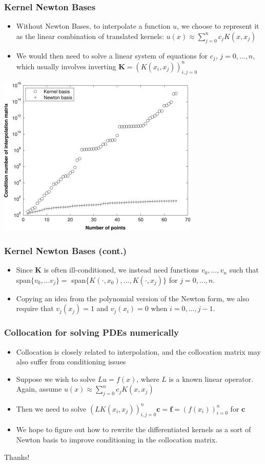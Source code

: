 \documentclass{beamer}
\begin{document}
\begin{frame}
\frametitle{Kernel Newton Bases}
\begin{itemize}
\item Without Newton Bases, to interpolate a function $u$, we choose to represent it as the linear combination of translated kernels: $u(x) \approx \sum_{j=0}^n c_j K(x, x_j)$
\item We would then need to solve a linear system of equations for $c_j$, $j=0,...,n$, which usually involves inverting $\mathbf{K} = (K(x_i,x_j))_{i,j=0}^n$
\end{itemize}
\centering\includegraphics[scale=0.6]{ill_cond}

\end{frame}

\begin{frame}
\frametitle{Kernel Newton Bases (cont.)}
\begin{itemize}
\item Since $\mathbf{K}$ is often ill-conditioned, we instead need functions $v_0, ..., v_n$ such that span$\{ v_0, ... v_j \} = $ span$\{K(\cdot, x_0), ..., K(\cdot, x_j)\}$ for $j=0,...,n$. %
\item Copying an idea from the polynomial version of the Newton form, we also require that $v_j(x_j) = 1$ and $v_j(x_i) = 0$ when $i = 0, ..., j-1$.
\end{itemize}
\end{frame}

\begin{frame}
\frametitle{Collocation for solving PDEs numerically}
\begin{itemize}
\item Collocation is closely related to interpolation, and the collocation matrix may also suffer from conditioning issues
\item Suppose we wish to solve $Lu = f(x)$, where $L$ is a known linear operator. Again, assume $u(x) \approx \sum_{j=0}^n c_j K(x, x_j)$
\item Then we need to solve  $(LK(x_i, x_j))_{i,j=0}^n \mathbf{c} = \mathbf{f} = (f(x_i))_{i=0}^n$ for $\mathbf{c}$ 
\item We hope to figure out how to rewrite the differentiated kernels as a sort of Newton basis to improve conditioning in the collocation matrix.
\end{itemize}
\end{frame}


\begin{frame}
\Huge{\centerline{Thanks!}}
\end{frame}

\end{document}
